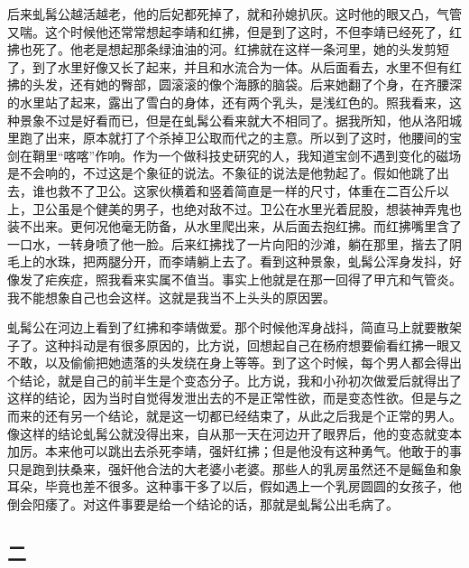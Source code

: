 后来虬髯公越活越老，他的后妃都死掉了，就和孙媳扒灰。这时他的眼又凸，气管又喘。这个时候他还常常想起李靖和红拂，但是到了这时，不但李靖已经死了，红拂也死了。他老是想起那条绿油油的河。红拂就在这样一条河里，她的头发剪短了，到了水里好像又长了起来，并且和水流合为一体。从后面看去，水里不但有红拂的头发，还有她的臀部，圆滚滚的像个海豚的脑袋。后来她翻了个身，在齐腰深的水里站了起来，露出了雪白的身体，还有两个乳头，是浅红色的。照我看来，这种景象不过是好看而已，但是在虬髯公看来就大不相同了。据我所知，他从洛阳城里跑了出来，原本就打了个杀掉卫公取而代之的主意。所以到了这时，他腰间的宝剑在鞘里“喀喀”作响。作为一个做科技史研究的人，我知道宝剑不遇到变化的磁场是不会响的，不过这是个象征的说法。不象征的说法是他勃起了。假如他跳了出去，谁也救不了卫公。这家伙横着和竖着简直是一样的尺寸，体重在二百公斤以上，卫公虽是个健美的男子，也绝对敌不过。卫公在水里光着屁股，想装神弄鬼也装不出来。更何况他毫无防备，从水里爬出来，从后面去抱红拂。而红拂嘴里含了一口水，一转身喷了他一脸。后来红拂找了一片向阳的沙滩，躺在那里，揩去了阴毛上的水珠，把两腿分开，而李靖躺上去了。看到这种景象，虬髯公浑身发抖，好像发了疟疾症，照我看来实属不值当。事实上他就是在那一回得了甲亢和气管炎。我不能想象自己也会这样。这就是我当不上头头的原因罢。 

虬髯公在河边上看到了红拂和李靖做爱。那个时候他浑身战抖，简直马上就要散架子了。这种抖动是有很多原因的，比方说，回想起自己在杨府想要偷看红拂一眼又不敢，以及偷偷把她遗落的头发绕在身上等等。到了这个时候，每个男人都会得出个结论，就是自己的前半生是个变态分子。比方说，我和小孙初次做爱后就得出了这样的结论，因为当时自觉得发泄出去的不是正常性欲，而是变态性欲。但是与之而来的还有另一个结论，就是这一切都已经结束了，从此之后我是个正常的男人。像这样的结论虬髯公就没得出来，自从那一天在河边开了眼界后，他的变态就变本加厉。本来他可以跳出去杀死李靖，强奸红拂；但是他没有这种勇气。他敢于的事只是跑到扶桑来，强奸他合法的大老婆小老婆。那些人的乳房虽然还不是鳐鱼和象耳朵，毕竟也差不很多。这种事干多了以后，假如遇上一个乳房圆圆的女孩子，他倒会阳痿了。对这件事要是给一个结论的话，那就是虬髯公出毛病了。 

\subsection{二} 

